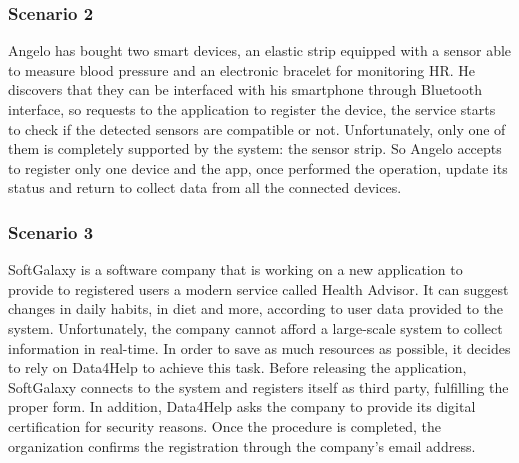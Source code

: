 {\color{Blue}\subsubsection{Scenario 2}}

Angelo has bought two smart devices, an elastic strip equipped with a sensor able to measure blood pressure and an electronic bracelet for monitoring HR. He discovers that they can be interfaced with his smartphone through Bluetooth interface, so requests to the application to register the device, the service starts to check if the detected sensors are compatible or not. Unfortunately, only one of them is completely supported by the system: the sensor strip. So Angelo accepts to register only one device and the app, once performed the operation, update its status and return to collect data from all the connected devices.
\paragraph{}


{\color{Blue}\subsubsection{Scenario 3}}

SoftGalaxy is a software company that is working on a new application to provide to registered users a modern service called Health Advisor. It can suggest changes in daily habits, in diet and more, according to user data provided to the system. Unfortunately, the company cannot afford a large-scale system to collect information in real-time. In order to save as much resources as possible, it decides to rely on Data4Help to achieve this task. Before releasing the application, SoftGalaxy connects to the system and registers itself as third party, fulfilling the proper form. In addition, Data4Help asks the company to provide its digital certification for security reasons. Once the procedure is completed, the organization confirms the registration through the company's email address. 
\paragraph{}


